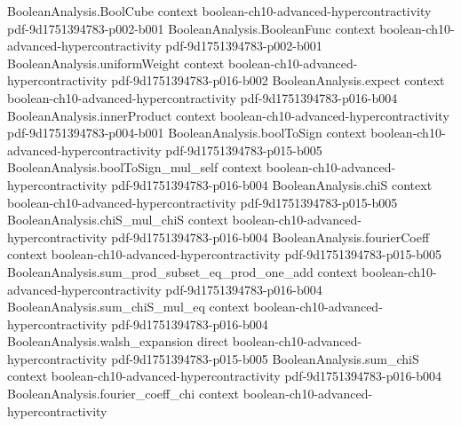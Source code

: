 \begin{theorem}
\label{BooleanAnalysis.Hypercontractivity.general_two_function_hypercontractivity}
\leanok
{}
\proofstep
  {BooleanAnalysis.BoolCube}
  {context}
  {boolean-ch10-advanced-hypercontractivity}
  {pdf-9d1751394783-p002-b001}
\proofstep
  {BooleanAnalysis.BooleanFunc}
  {context}
  {boolean-ch10-advanced-hypercontractivity}
  {pdf-9d1751394783-p002-b001}
\proofstep
  {BooleanAnalysis.uniformWeight}
  {context}
  {boolean-ch10-advanced-hypercontractivity}
  {pdf-9d1751394783-p016-b002}
\proofstep
  {BooleanAnalysis.expect}
  {context}
  {boolean-ch10-advanced-hypercontractivity}
  {pdf-9d1751394783-p016-b004}
\proofstep
  {BooleanAnalysis.innerProduct}
  {context}
  {boolean-ch10-advanced-hypercontractivity}
  {pdf-9d1751394783-p004-b001}
\proofstep
  {BooleanAnalysis.boolToSign}
  {context}
  {boolean-ch10-advanced-hypercontractivity}
  {pdf-9d1751394783-p015-b005}
\proofstep
  {BooleanAnalysis.boolToSign_mul_self}
  {context}
  {boolean-ch10-advanced-hypercontractivity}
  {pdf-9d1751394783-p016-b004}
\proofstep
  {BooleanAnalysis.chiS}
  {context}
  {boolean-ch10-advanced-hypercontractivity}
  {pdf-9d1751394783-p015-b005}
\proofstep
  {BooleanAnalysis.chiS_mul_chiS}
  {context}
  {boolean-ch10-advanced-hypercontractivity}
  {pdf-9d1751394783-p016-b004}
\proofstep
  {BooleanAnalysis.fourierCoeff}
  {context}
  {boolean-ch10-advanced-hypercontractivity}
  {pdf-9d1751394783-p015-b005}
\proofstep
  {BooleanAnalysis.sum_prod_subset_eq_prod_one_add}
  {context}
  {boolean-ch10-advanced-hypercontractivity}
  {pdf-9d1751394783-p016-b004}
\proofstep
  {BooleanAnalysis.sum_chiS_mul_eq}
  {context}
  {boolean-ch10-advanced-hypercontractivity}
  {pdf-9d1751394783-p016-b004}
\proofstep
  {BooleanAnalysis.walsh_expansion}
  {direct}
  {boolean-ch10-advanced-hypercontractivity}
  {pdf-9d1751394783-p015-b005}
\proofstep
  {BooleanAnalysis.sum_chiS}
  {context}
  {boolean-ch10-advanced-hypercontractivity}
  {pdf-9d1751394783-p016-b004}
\proofstep
  {BooleanAnalysis.fourier_coeff_chi}
  {context}
  {boolean-ch10-advanced-hypercontractivity}

\end{theorem}
